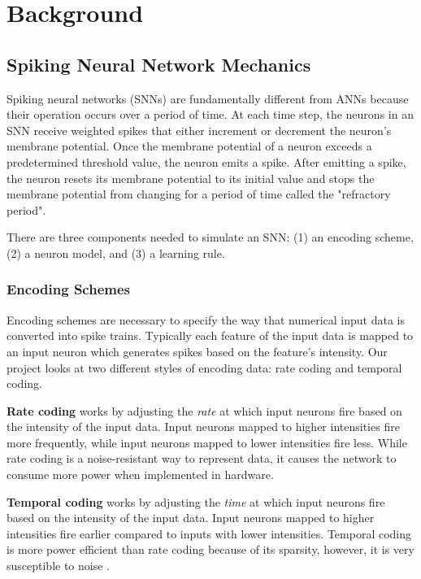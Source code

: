 \documentclass[journal]{IEEEtran}
\begin{document}
\section{Background}

\subsection{Spiking Neural Network Mechanics}

Spiking neural networks (SNNs) are fundamentally different from ANNs because their operation occurs over a period of time. At each time step, the neurons in an SNN receive weighted spikes that either increment or decrement the neuron's membrane potential. Once the membrane potential of a neuron exceeds a predetermined threshold value, the neuron emits a spike. After emitting a spike, the neuron resets its membrane potential to its initial value and stops the membrane potential from changing for a period of time called the "refractory period".

There are three components needed to simulate an SNN: (1) an encoding scheme, (2) a neuron model, and (3) a learning rule.

\subsubsection{Encoding Schemes}

Encoding schemes are necessary to specify the way that numerical input data is converted into spike trains. Typically each feature of the input data is mapped to an input neuron which generates spikes based on the feature's intensity. Our project looks at two different styles of encoding data: rate coding and temporal coding.


\textbf{Rate coding} works by adjusting the \emph{rate} at which input neurons fire based on the intensity of the input data. Input neurons mapped to higher intensities fire more frequently, while input neurons mapped to lower intensities fire less. While rate coding is a noise-resistant way to represent data, it causes the network to consume more power when implemented in hardware.

\textbf{Temporal coding} works by adjusting the \emph{time} at which input neurons fire based on the intensity of the input data. Input neurons mapped to higher intensities fire earlier compared to inputs with lower intensities. Temporal coding is more power efficient than rate coding because of its sparsity, however, it is very susceptible to noise \cite{thorpe1998rank}.
\end{document}
